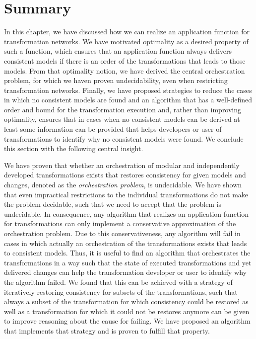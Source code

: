 \section{Summary}

In this chapter, we have discussed how we can realize an application function for transformation networks.
We have motivated optimality as a desired property of such a function, which ensures that an application function always delivers consistent models if there is an order of the transformations that leads to those models. 
From that optimality notion, we have derived the central orchestration problem, for which we haven proven undecidability, even when restricting transformation networks.
Finally, we have proposed strategies to reduce the cases in which no consistent models are found and an algorithm that has a well-defined order and bound for the transformation execution and, rather than improving optimality, ensures that in cases when no consistent models can be derived at least some information can be provided that helps developers or user of transformations to identify why no consistent models were found.
We conclude this section with the following central insight.

\begin{insight}[Orchestration]
    We have proven that whether an orchestration of modular and independently developed transformations exists that restores consistency for given models and changes, denoted as the \emph{orchestration problem}, is undecidable.
    We have shown that even impractical restrictions to the individual transformations do not make the problem decidable, such that we need to accept that the problem is undecidable.
    In consequence, any algorithm that realizes an application function for transformations can only implement a conservative approximation of the orchestration problem.
    Due to this conservativeness, any algorithm will fail in cases in which actually an orchestration of the transformations exists that leads to consistent models.
    Thus, it is useful to find an algorithm that orchestrates the transformations in a way such that the state of executed transformations and yet delivered changes can help the transformation developer or user to identify why the algorithm failed.
    We found that this can be achieved with a strategy of iteratively restoring consistency for subsets of the transformations, such that always a subset of the transformation for which consistency could be restored as well as a transformation for which it could not be restores anymore can be given to improve reasoning about the cause for failing.
    We have proposed an algorithm that implements that strategy and is proven to fulfill that property.
\end{insight}